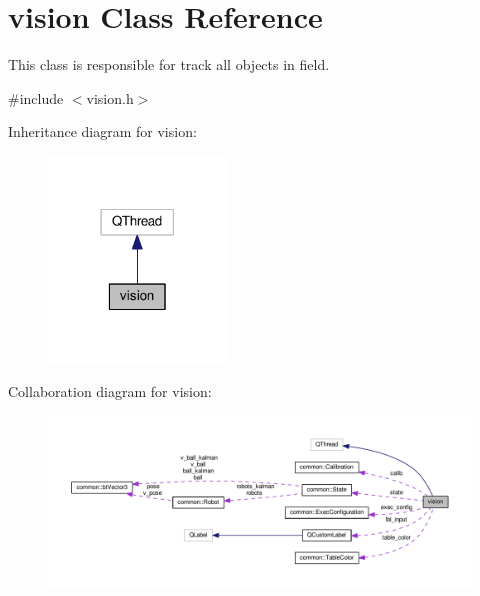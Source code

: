 \hypertarget{classvision}{}\section{vision Class Reference}
\label{classvision}


This class is responsible for track all objects in field.  




{\ttfamily \#include $<$vision.\+h$>$}



Inheritance diagram for vision\+:\nopagebreak
\begin{figure}[H]
\begin{center}
\leavevmode
\includegraphics[width=134pt]{classvision__inherit__graph}
\end{center}
\end{figure}


Collaboration diagram for vision\+:\nopagebreak
\begin{figure}[H]
\begin{center}
\leavevmode
\includegraphics[width=350pt]{classvision__coll__graph}
\end{center}
\end{figure}
